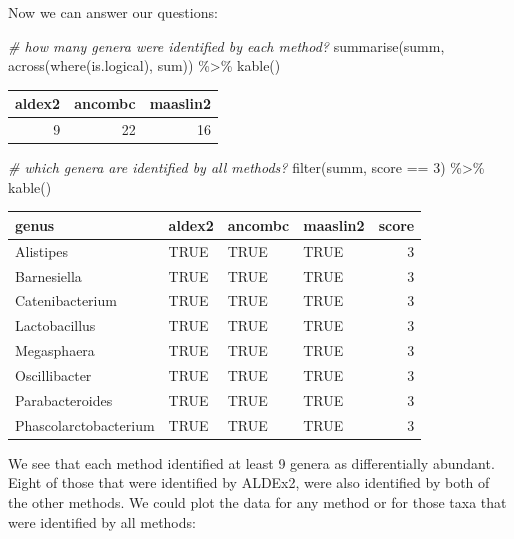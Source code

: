 \documentclass[
]{book}
\newenvironment{Shaded}{\begin{snugshade}}{\end{snugshade}}
\newcommand{\CommentTok}[1]{\textcolor[rgb]{0.56,0.35,0.01}{\textit{#1}}}
\newcommand{\DecValTok}[1]{\textcolor[rgb]{0.00,0.00,0.81}{#1}}
\newcommand{\FunctionTok}[1]{\textcolor[rgb]{0.00,0.00,0.00}{#1}}
\newcommand{\NormalTok}[1]{#1}
\newcommand{\SpecialCharTok}[1]{\textcolor[rgb]{0.00,0.00,0.00}{#1}}
\begin{document}
Now we can answer our questions:

\begin{Shaded}
\begin{Highlighting}[]
\CommentTok{\# how many genera were identified by each method?}
\FunctionTok{summarise}\NormalTok{(summ, }\FunctionTok{across}\NormalTok{(}\FunctionTok{where}\NormalTok{(is.logical), sum)) }\SpecialCharTok{\%\textgreater{}\%}
  \FunctionTok{kable}\NormalTok{()}
\end{Highlighting}
\end{Shaded}

\begin{tabular}{r|r|r}
\hline
aldex2 & ancombc & maaslin2\\
\hline
9 & 22 & 16\\
\hline
\end{tabular}

\begin{Shaded}
\begin{Highlighting}[]
\CommentTok{\# which genera are identified by all methods?}
\FunctionTok{filter}\NormalTok{(summ, score }\SpecialCharTok{==} \DecValTok{3}\NormalTok{) }\SpecialCharTok{\%\textgreater{}\%} \FunctionTok{kable}\NormalTok{()}
\end{Highlighting}
\end{Shaded}

\begin{tabular}{l|l|l|l|r}
\hline
genus & aldex2 & ancombc & maaslin2 & score\\
\hline
Alistipes & TRUE & TRUE & TRUE & 3\\
\hline
Barnesiella & TRUE & TRUE & TRUE & 3\\
\hline
Catenibacterium & TRUE & TRUE & TRUE & 3\\
\hline
Lactobacillus & TRUE & TRUE & TRUE & 3\\
\hline
Megasphaera & TRUE & TRUE & TRUE & 3\\
\hline
Oscillibacter & TRUE & TRUE & TRUE & 3\\
\hline
Parabacteroides & TRUE & TRUE & TRUE & 3\\
\hline
Phascolarctobacterium & TRUE & TRUE & TRUE & 3\\
\hline
\end{tabular}

We see that each method identified at least 9 genera as differentially
abundant. Eight of those that were identified by ALDEx2,
were also identified by both of the other methods. We could plot the data for
any method or for those taxa that were identified by all methods:
\end{document}
